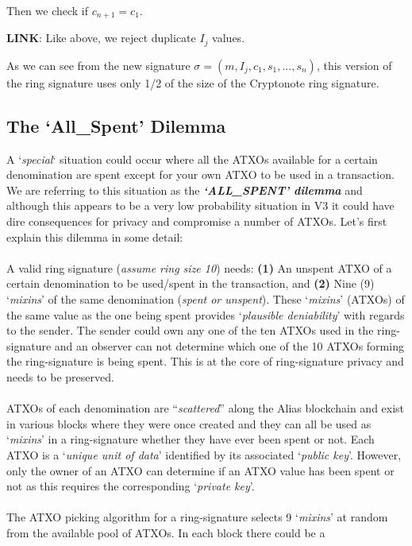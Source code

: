 Then we check if $c_{n+1}=c_1$.

\hfill \break\textbf{LINK}: 
Like above, we reject duplicate $I_j$ values.


\hfill \break As we can see from the new signature $\sigma = 
(m,I_j,c_1,s_1,...,s_n)$, this version of the ring signature 
uses only 1/2 of the size of the Cryptonote ring signature.
\newpage

\subsection{The ‘All\_Spent’ Dilemma}
A ‘\textit{special}‘ situation could occur where all the ATXOs available for a
certain denomination are spent except for your own ATXO to be used in a transaction.
We are referring to this situation as the \textbf{\textit{‘ALL\_SPENT’ dilemma}}
and although this appears to be a very low probability situation in V3 it could
have dire consequences for privacy and compromise a number of ATXOs. Let’s first
explain this dilemma in some detail:
\\
\\
\noindent
A valid ring signature (\textit{assume ring size 10}) needs: \textbf{(1)} An
unspent ATXO of a certain denomination to be used/spent in the transaction,
and \textbf{(2)} Nine (9) ‘\textit{mixins}’ of the same denomination
(\textit{spent or unspent}). These ‘\textit{mixins}’ (ATXOs) of the same
value as the one being spent provides ‘\textit{plausible deniability}’ with
regards to the sender. The sender could own any one of the ten ATXOs used
in the ring-signature and an observer can not determine which one of the
10 ATXOs forming the ring-signature is being spent. This is at the core of
ring-signature privacy and needs to be preserved.
\\
\\
\noindent
ATXOs of each denomination are “\textit{scattered}” along the Alias
blockchain and exist in various blocks where they were once created and
they can all be used as ‘\textit{mixins}’ in a ring-signature whether they
have ever been spent or not. Each ATXO is a ‘\textit{unique unit of data}’
identified by its associated ‘\textit{public key}’. However, only the
owner of an ATXO can determine if an ATXO value has been spent or not
as this requires the corresponding ‘\textit{private key}’.
\\
\\
\noindent
The ATXO picking algorithm for a ring-signature selects 9 ‘\textit{mixins}’
at random from the available pool of ATXOs. In each block there could be a
